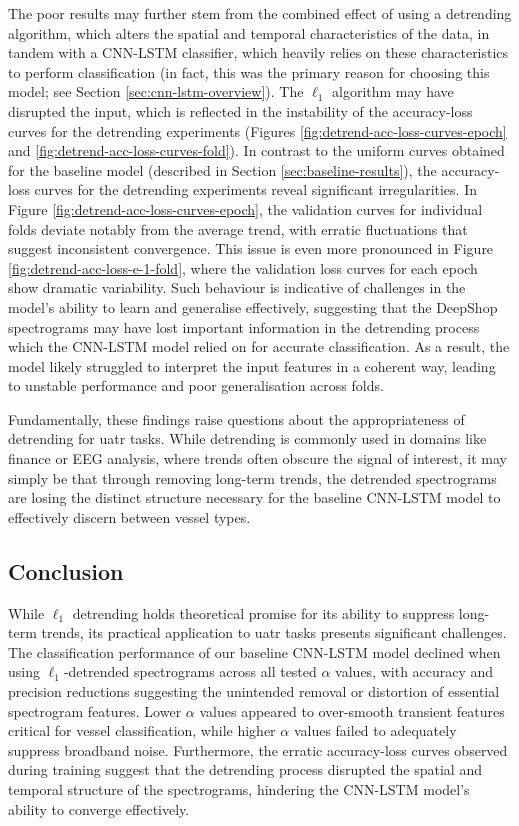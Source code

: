 The poor results may further stem from the combined effect of using a detrending algorithm, which alters the spatial and temporal characteristics of the data, in tandem with a CNN-LSTM classifier, which heavily relies on these characteristics to perform classification (in fact, this was the primary reason for choosing this model; see Section \ref{sec:cnn-lstm-overview}). The $\ell_1$ algorithm may have disrupted the input, which is reflected in the instability of the accuracy-loss curves for the detrending experiments (Figures \ref{fig:detrend-acc-loss-curves-epoch} and \ref{fig:detrend-acc-loss-curves-fold}). In contrast to the uniform curves obtained for the baseline model (described in Section \ref{sec:baseline-results}), the accuracy-loss curves for the detrending experiments reveal significant irregularities. In Figure \ref{fig:detrend-acc-loss-curves-epoch}, the validation curves for individual folds deviate notably from the average trend, with erratic fluctuations that suggest inconsistent convergence. This issue is even more pronounced in Figure \ref{fig:detrend-acc-loss-e-1-fold}, where the validation loss curves for each epoch show dramatic variability. Such behaviour is indicative of challenges in the model's ability to learn and generalise effectively, suggesting that the DeepShop spectrograms may have lost important information in the detrending process which the CNN-LSTM model relied on for accurate classification. As a result, the model likely struggled to interpret the input features in a coherent way, leading to unstable performance and poor generalisation across folds.

Fundamentally, these findings raise questions about the appropriateness of detrending for \acrshort{uatr} tasks. While detrending is commonly used in domains like finance or EEG analysis, where trends often obscure the signal of interest, it may simply be that through removing long-term trends, the detrended spectrograms are losing the distinct structure necessary for the baseline CNN-LSTM model to effectively discern between vessel types.  

\subsection{Conclusion}

While $\ell_1$ detrending holds theoretical promise for its ability to suppress long-term trends, its practical application to \acrshort{uatr} tasks presents significant challenges. The classification performance of our baseline CNN-LSTM model declined when using $\ell_1$-detrended spectrograms across all tested $\alpha$ values, with accuracy and precision reductions suggesting the unintended removal or distortion of essential spectrogram features. Lower $\alpha$ values appeared to over-smooth transient features critical for vessel classification, while higher $\alpha$ values failed to adequately suppress broadband noise. Furthermore, the erratic accuracy-loss curves observed during training suggest that the detrending process disrupted the spatial and temporal structure of the spectrograms, hindering the CNN-LSTM model's ability to converge effectively.

